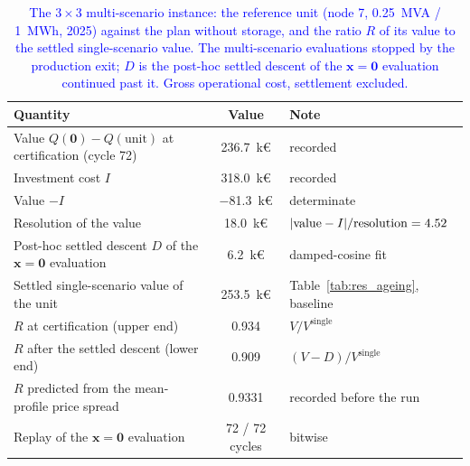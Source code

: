 \begin{table}[htbp!]
    \centering
    \caption{\textcolor{blue}{The $3 \times 3$ multi-scenario instance: the reference unit (node 7, 0.25~MVA / 1~MWh, 2025) against the plan without storage, and the ratio $R$ of its value to the settled single-scenario value. The multi-scenario evaluations stopped by the production exit; $D$ is the post-hoc settled descent of the $\boldsymbol{x} = \boldsymbol{0}$ evaluation continued past it. Gross operational cost, settlement excluded.}}
    \label{tab:res_multiscenario}
    \scriptsize\setlength{\tabcolsep}{4pt}
    \begin{tabular}{l c l}
        \toprule
        Quantity & Value & Note \\
        \midrule
        Value $Q(\boldsymbol{0}) - Q(\text{unit})$ at certification (cycle 72) & 236.7~k\euro & recorded \\
        Investment cost $I$                                                  & 318.0~k\euro & recorded \\
        Value $- I$                                                          & $-$81.3~k\euro & determinate \\
        Resolution of the value                                              & 18.0~k\euro  & $|{\rm value} - I| / {\rm resolution} = 4.52$ \\
        Post-hoc settled descent $D$ of the $\boldsymbol{x} = \boldsymbol{0}$ evaluation & 6.2~k\euro & damped-cosine fit \\
        Settled single-scenario value of the unit                           & 253.5~k\euro & Table~\ref{tab:res_ageing}, baseline \\
        $R$ at certification (upper end)                                     & 0.934 & $V / V^{\text{single}}$ \\
        $R$ after the settled descent (lower end)                            & 0.909 & $(V - D) / V^{\text{single}}$ \\
        $R$ predicted from the mean-profile price spread                     & 0.9331 & recorded before the run \\
        Replay of the $\boldsymbol{x} = \boldsymbol{0}$ evaluation           & 72 / 72 cycles & bitwise \\
        \bottomrule
    \end{tabular}
\end{table}

